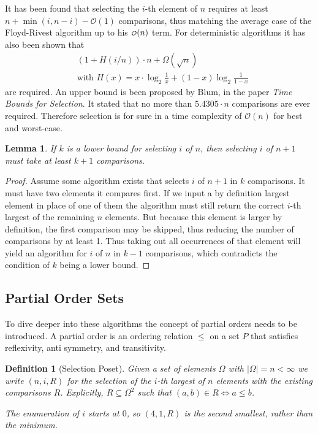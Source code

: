 \documentclass[10pt,journal,compsoc]{IEEEtran}
\newcommand\smallO{
  \mathchoice
    {{\scriptstyle\mathcal{O}}}%
    {{\scriptstyle\mathcal{O}}}%
    {{\scriptscriptstyle\mathcal{O}}}%
    {\scalebox{.50}{$\scriptscriptstyle\mathcal{O}$}}%
  }
\newtheorem{lemma}{Lemma}
\newtheorem{definition}{Definition}
\begin{document}
It has been found that selecting the $i$-th element of $n$ requires at least
$n+\min(i,n-i)-\mathcal{O}(1)$ comparisons, thus matching the average case of the Floyd-Rivest
algorithm up to his $\smallO(n)$ term. For deterministic algorithms it has also been shown that
\begin{eqnarray*}
  &\left (1 + H(i/n) \right ) \cdot n + \Omega(\sqrt n) \\
  &\text{with~} H(x) = x \cdot \log_2 \frac{1}{x} + (1-x) \log_2 \frac{1}{1-x}
\end{eqnarray*}
are required. An upper bound is been proposed by Blum, in the paper \textit{Time Bounds for
  Selection}. It stated that no more than $5.430\dot{5} \cdot n$ comparisons are ever required.
Therefore selection is for sure in a time complexity of $\mathcal{O}(n)$ for best and worst-case.

\begin{lemma}
  If $k$ is a lower bound for selecting $i$ of $n$, then selecting $i$ of $n+1$ must take at least $k+1$ comparisons.
\end{lemma}
\begin{proof}
  Assume some algorithm exists that selects $i$ of $n+1$ in $k$ comparisons. It must have two elements it compares first.
  If we input a by definition largest element in place of one of them the algorithm must still return the correct $i$-th
  largest of the remaining $n$ elements. But because this element is larger by definition, the first comparison may be 
  skipped, thus reducing the number of comparisons by at least 1. Thus taking out all occurrences of that element will 
  yield an algorithm for $i$ of $n$ in $k-1$ comparisons, which contradicts the condition of $k$ being a lower bound.
\end{proof}

\subsection{Partial Order Sets}
To dive deeper into these algorithms the concept of partial orders needs to be introduced. A partial
order is an ordering relation
$\leq$ on a set $P$ that satisfies reflexivity, anti symmetry, and transitivity. 

\begin{definition}[Selection Poset]
  Given a set of elements $\Omega$ with $|\Omega| = n < \infty$ we write 
  $(n, i, R)$ for the selection of the $i$-th largest of $n$ elements
  with the existing comparisons $R$.
  Explicitly, $R\subseteq\Omega^2$ such that $(a, b)\in R \Longleftrightarrow a \leq b$.

  The enumeration of $i$ starts at $0$, so $(4, 1, R)$ is the second smallest,
  rather than the minimum.
\end{definition}
\end{document}
